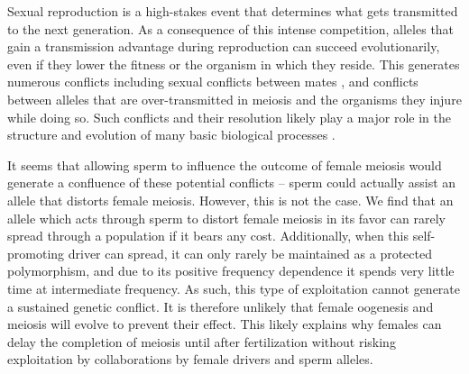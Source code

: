 \documentclass[12pt,letterpaper]{article}
\newcommand{\yb}[1]{{ \color{blue} #1}}
\begin{document}
Sexual reproduction is a high-stakes event that determines what gets transmitted to the next generation.  
As a consequence of this intense competition, alleles that gain a transmission advantage during reproduction 
	can succeed evolutionarily, even if they lower the 
        fitness or the organism in which they reside. 
This generates numerous conflicts  \cite{Burt2006} including sexual conflicts between mates \cite{Arnqvist2005}, 
	and conflicts between alleles that are over-transmitted in meiosis and the organisms they injure while doing so. 
Such conflicts and their resolution likely play a major role in the structure and evolution of many basic biological processes \citep{Rice2013}.

It seems that allowing sperm to influence the outcome of female meiosis would generate a confluence of these potential conflicts -- 
	sperm could actually assist an allele that distorts female meiosis.
However, this is not the case.
We find that an allele which acts through sperm to distort female meiosis in its favor %
	can rarely spread through a population if it bears any cost. 
Additionally, when this self-promoting driver can spread, it can only rarely 
	be maintained as a protected polymorphism, and due to its positive frequency dependence 
	it spends very little time at intermediate frequency.
As such, this type of exploitation cannot generate a sustained genetic conflict.
It is therefore unlikely
	that female oogenesis and meiosis will evolve to prevent their effect.  
This likely explains why females can delay the completion of meiosis until after fertilization 
	without risking exploitation by collaborations by female
        drivers and sperm alleles.
\end{document}
